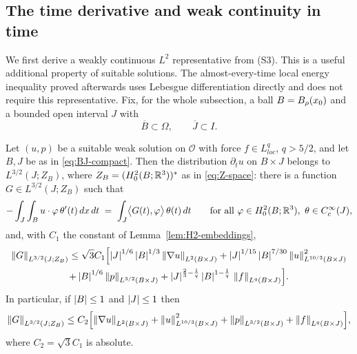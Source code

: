 \documentclass[11pt,reqno]{amsart}
\begin{document}
\subsection{The time derivative and weak continuity in time}\label{ss:time}

We first derive a weakly continuous $L^{2}$ representative from (S3). This
is a useful additional property of suitable solutions. The almost-every-time
local energy inequality proved afterwards uses Lebesgue differentiation
directly and does not require this representative. Fix, for the whole
subsection, a ball $B=B_{\rho}(x_{0})$ and a
bounded open interval $J$ with
\begin{equation}\label{eq:BJ-compact}
  \overline{B}\subset\Omega,\qquad \overline{J}\subset I .
\end{equation}

\begin{lemma}\label{lem:dtu-dual}
Let $(u,p)$ be a suitable weak solution on $\mathcal{O}$ with force
$f\in L^{q}_{loc}$, $q>5/2$, and let $B,J$ be as in \eqref{eq:BJ-compact}. Then
the distribution $\partial_{t}u$ on $B\times J$ belongs to
$L^{3/2}(J;Z_{B})$, where $Z_{B}=(H^{2}_{0}(B;\mathbb{R}^{3}))^{*}$ as in
\eqref{eq:Z-space}: there is a function
$G\in L^{3/2}(J;Z_{B})$ such that
\begin{equation}\label{eq:dtu-weak}
  -\int_{J}\int_{B}u\cdot\varphi\,\theta'(t)\,dx\,dt
  \;=\;\int_{J}\bigl\langle G(t),\varphi\bigr\rangle\,\theta(t)\,dt
  \qquad
  \text{for all }\varphi\in H^{2}_{0}(B;\mathbb{R}^{3}),\ \theta\in C_{c}^{\infty}(J),
\end{equation}
and, with $C_{1}$ the constant of Lemma~\ref{lem:H2-embeddings},
\begin{multline}\label{eq:dtu-bound}
  \left\lVert G \right\rVert_{L^{3/2}(J;Z_{B})}
  \le\sqrt{3}C_{1}\Bigl[
      \left\lvert J \right\rvert^{1/6}\left\lvert B \right\rvert^{1/3}\left\lVert \nabla u \right\rVert_{L^{2}(B\times J)}
      +\left\lvert J \right\rvert^{1/15}\left\lvert B \right\rvert^{7/30}\left\lVert u \right\rVert_{L^{10/3}(B\times J)}^{2}\\
      +\left\lvert B \right\rvert^{1/6}\left\lVert p \right\rVert_{L^{3/2}(B\times J)}
      +\left\lvert J \right\rvert^{\frac23-\frac1q}\left\lvert B \right\rvert^{1-\frac1q}\,\left\lVert f \right\rVert_{L^{q}(B\times J)}
     \Bigr].
\end{multline}
In particular, if $\left\lvert B \right\rvert\le1$ and $\left\lvert J \right\rvert\le1$ then
\begin{equation}\label{eq:dtu-bound-simple}
  \left\lVert G \right\rVert_{L^{3/2}(J;Z_{B})}
  \le C_{2}\Bigl[\left\lVert \nabla u \right\rVert_{L^{2}(B\times J)}
    +\left\lVert u \right\rVert_{L^{10/3}(B\times J)}^{2}
    +\left\lVert p \right\rVert_{L^{3/2}(B\times J)}
    +\left\lVert f \right\rVert_{L^{q}(B\times J)}\Bigr],
\end{equation}
where $C_{2}=\sqrt{3}C_{1}$ is absolute.
\end{lemma}
\end{document}
